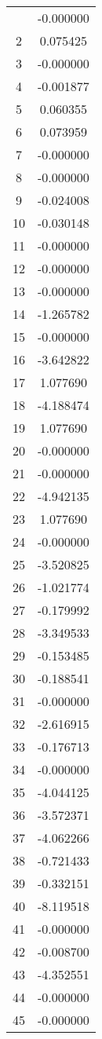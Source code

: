 \documentclass[12pt]{article}
\begin{document}
\begin{longtable}{@{}cc@{}}
\bottomrule
\endlastfoot
1 & -0.000000 \\
2 & 0.075425 \\
3 & -0.000000 \\
4 & -0.001877 \\
5 & 0.060355 \\
6 & 0.073959 \\
7 & -0.000000 \\
8 & -0.000000 \\
9 & -0.024008 \\
10 & -0.030148 \\
11 & -0.000000 \\
12 & -0.000000 \\
13 & -0.000000 \\
14 & -1.265782 \\
15 & -0.000000 \\
16 & -3.642822 \\
17 & 1.077690 \\
18 & -4.188474 \\
19 & 1.077690 \\
20 & -0.000000 \\
21 & -0.000000 \\
22 & -4.942135 \\
23 & 1.077690 \\
24 & -0.000000 \\
25 & -3.520825 \\
26 & -1.021774 \\
27 & -0.179992 \\
28 & -3.349533 \\
29 & -0.153485 \\
30 & -0.188541 \\
31 & -0.000000 \\
32 & -2.616915 \\
33 & -0.176713 \\
34 & -0.000000 \\
35 & -4.044125 \\
36 & -3.572371 \\
37 & -4.062266 \\
38 & -0.721433 \\
39 & -0.332151 \\
40 & -8.119518 \\
41 & -0.000000 \\
42 & -0.008700 \\
43 & -4.352551 \\
44 & -0.000000 \\
45 & -0.000000 \\

\end{longtable}
\end{document}
